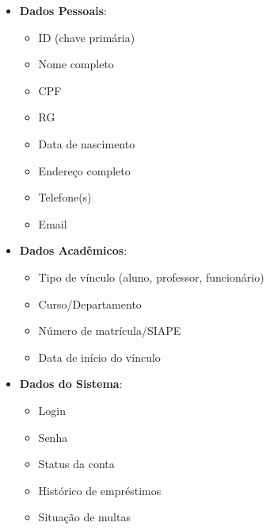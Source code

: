 \documentclass[12pt,a4paper]{article}
\begin{document}
\begin{tcolorbox}[title=Usuário]
\begin{itemize}[leftmargin=*]
    \item \textbf{Dados Pessoais}:
    \begin{itemize}
        \item ID (chave primária)
        \item Nome completo
        \item CPF
        \item RG
        \item Data de nascimento
        \item Endereço completo
        \item Telefone(s)
        \item Email
    \end{itemize}
    \item \textbf{Dados Acadêmicos}:
    \begin{itemize}
        \item Tipo de vínculo (aluno, professor, funcionário)
        \item Curso/Departamento
        \item Número de matrícula/SIAPE
        \item Data de início do vínculo
    \end{itemize}
    \item \textbf{Dados do Sistema}:
    \begin{itemize}
        \item Login
        \item Senha
        \item Status da conta
        \item Histórico de empréstimos
        \item Situação de multas
    \end{itemize}
\end{itemize}
\end{tcolorbox}
\end{document}
